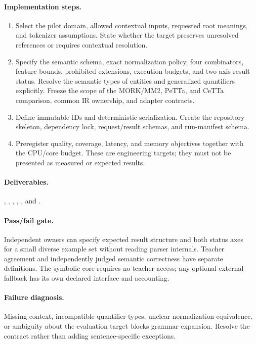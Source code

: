 \documentclass[11pt,a4paper]{article}
\begin{document}
\paragraph{Implementation steps.}
\begin{enumerate}
\item Select the pilot domain, allowed contextual inputs, requested root meanings, and tokenizer assumptions. State whether the target preserves unresolved references or requires contextual resolution.
\item Specify the semantic schema, exact normalization policy, four combinators, feature bounds, prohibited extensions, execution budgets, and two-axis result status. Resolve the semantic types of entities and generalized quantifiers explicitly. Freeze the scope of the MORK/MM2, PeTTa, and CeTTa comparison, common IR ownership, and adapter contracts.
\item Define immutable IDs and deterministic serialization. Create the repository skeleton, dependency lock, request/result schemas, and run-manifest schema.
\item Preregister quality, coverage, latency, and memory objectives together with the CPU/core budget. These are engineering targets; they must not be presented as measured or expected results.
\end{enumerate}

\paragraph{Deliverables.} , , , , , and .

\paragraph{Pass/fail gate.} Independent owners can specify expected result structure and both status axes for a small diverse example set without reading parser internals. Teacher agreement and independently judged semantic correctness have separate definitions. The symbolic core requires no teacher access; any optional external fallback has its own declared interface and accounting.

\paragraph{Failure diagnosis.} Missing context, incompatible quantifier types, unclear normalization equivalence, or ambiguity about the evaluation target blocks grammar expansion. Resolve the contract rather than adding sentence-specific exceptions.
\end{document}
